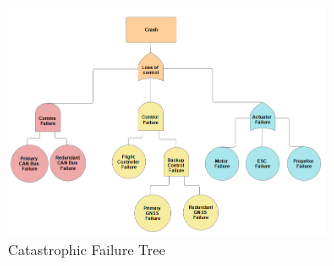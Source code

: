 \begin{figure}[htbp]
  \centering
  \includegraphics[width=0.75\textwidth]{figs/Thomas/Return To Safety/Fault Tree.png}
  \caption{Catastrophic Failure Tree}
  \label{fig:fault_tree}
\end{figure}